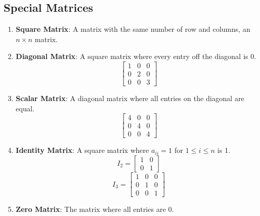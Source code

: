 \documentclass[letterpaper, 12pt]{math}
\begin{document}
\subsection*{Special Matrices}
\begin{enumerate}
  \item \textbf{Square Matrix}: A matrix with the same number of row and
    columns, an \( n \times n \) matrix.
  \item \textbf{Diagonal Matrix}: A square matrix where every entry off the
    diagonal is 0.
    \[ \begin{bmatrix}1 & 0 & 0 \\ 0 & 2 & 0 \\ 0 & 0 & 3\end{bmatrix} \]
  \item \textbf{Scalar Matrix}: A diagonal matrix where all entries on the
    diagonal are equal.
    \[ \begin{bmatrix}4 & 0 & 0 \\ 0 & 4 & 0 \\ 0 & 0 & 4\end{bmatrix} \]
  \item \textbf{Identity Matrix}: A square matrix where \( a_{ii} = 1 \) for
    \( 1\le i\le n \) is 1.
    \[ I_2 = \begin{bmatrix}1 & 0 \\ 0 & 1\end{bmatrix} \]
    \[ I_3 = \begin{bmatrix}1 & 0 & 0 \\ 0 & 1 & 0 \\ 0 & 0 & 1\end{bmatrix} \]
  \item \textbf{Zero Matrix}: The matrix where all entries are 0.
\end{enumerate}
\end{document}
